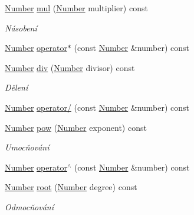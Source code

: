 \begin{DoxyCompactItemize}
\item 
\hyperlink{classteam22_1_1_math_1_1_number}{Number} \hyperlink{classteam22_1_1_math_1_1_number_aff9d2205901de7e4ee747de05173fb7b}{mul} (\hyperlink{classteam22_1_1_math_1_1_number}{Number} multiplier) const
\begin{DoxyCompactList}\small\item\em Násobení \end{DoxyCompactList}\item 
\hyperlink{classteam22_1_1_math_1_1_number}{Number} \hyperlink{classteam22_1_1_math_1_1_number_a0d0b4f119988b15a9b62f0886b3cf663}{operator$\ast$} (const \hyperlink{classteam22_1_1_math_1_1_number}{Number} \&number) const
\item 
\hyperlink{classteam22_1_1_math_1_1_number}{Number} \hyperlink{classteam22_1_1_math_1_1_number_a169aafbe3a08bcc9d0f8f07bee388516}{div} (\hyperlink{classteam22_1_1_math_1_1_number}{Number} divisor) const
\begin{DoxyCompactList}\small\item\em Dělení \end{DoxyCompactList}\item 
\hyperlink{classteam22_1_1_math_1_1_number}{Number} \hyperlink{classteam22_1_1_math_1_1_number_aa34d5ef75101e4b65f7840a1df0e8572}{operator/} (const \hyperlink{classteam22_1_1_math_1_1_number}{Number} \&number) const
\item 
\hyperlink{classteam22_1_1_math_1_1_number}{Number} \hyperlink{classteam22_1_1_math_1_1_number_af6d6c446579d8b8c2de69053baddd94d}{pow} (\hyperlink{classteam22_1_1_math_1_1_number}{Number} exponent) const
\begin{DoxyCompactList}\small\item\em Umocňování \end{DoxyCompactList}\item 
\hyperlink{classteam22_1_1_math_1_1_number}{Number} \hyperlink{classteam22_1_1_math_1_1_number_a7487165b416ce5db617eabb4d3415853}{operator$^\wedge$} (const \hyperlink{classteam22_1_1_math_1_1_number}{Number} \&number) const
\item 
\hyperlink{classteam22_1_1_math_1_1_number}{Number} \hyperlink{classteam22_1_1_math_1_1_number_ae2bbbafad08a50625b8070db1fc3ba98}{root} (\hyperlink{classteam22_1_1_math_1_1_number}{Number} degree) const
\begin{DoxyCompactList}\small\item\em Odmocňování \end{DoxyCompactList}\item 

\end{DoxyCompactItemize}
